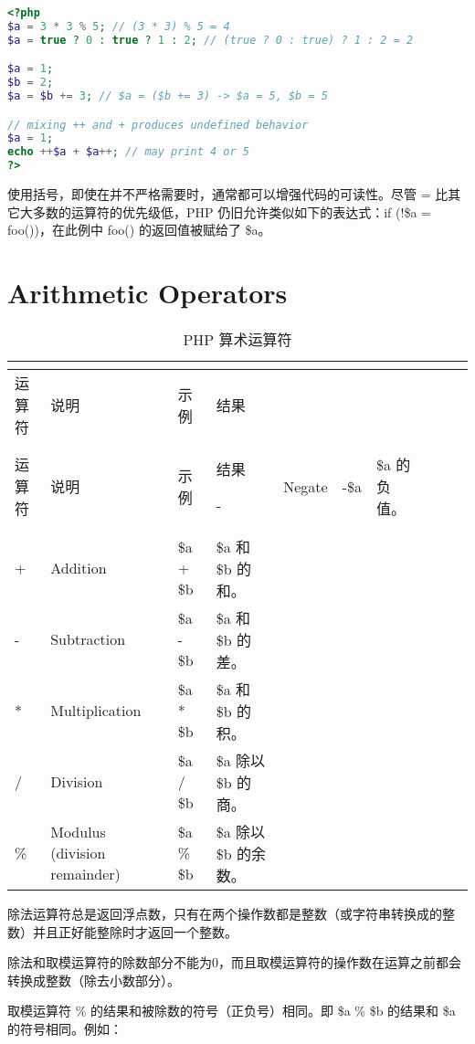 \begin{lstlisting}[language=PHP]
<?php
$a = 3 * 3 % 5; // (3 * 3) % 5 = 4
$a = true ? 0 : true ? 1 : 2; // (true ? 0 : true) ? 1 : 2 = 2

$a = 1;
$b = 2;
$a = $b += 3; // $a = ($b += 3) -> $a = 5, $b = 5

// mixing ++ and + produces undefined behavior
$a = 1;
echo ++$a + $a++; // may print 4 or 5
?>
\end{lstlisting}

使用括号，即使在并不严格需要时，通常都可以增强代码的可读性。尽管 = 比其它大多数的运算符的优先级低，PHP 仍旧允许类似如下的表达式：if (!\$a = foo())，在此例中 foo() 的返回值被赋给了 \$a。

\section{Arithmetic Operators}

\begin{longtable}{|m{35pt}|m{130pt}|m{50pt}|m{150pt}|}
\tabularnewline\hline
运算符	&说明	&示例	&结果
\endhead

\caption{PHP 算术运算符}\\
\hline
运算符	&说明	&示例	&结果
\endfirsthead

\endfoot

\endlastfoot
\hline
- &Negate		&-\$a					&\$a 的负值。\\
\hline
+	&Addition		&\$a + \$b		&\$a 和 \$b 的和。\\
\hline
-	&Subtraction	&\$a - \$b		&\$a 和 \$b 的差。\\
\hline
*	&Multiplication	&\$a * \$b		&\$a 和 \$b 的积。\\
\hline
/	&Division		&\$a / \$b		&\$a 除以\$b 的商。\\
\hline
\%	&Modulus (division remainder)	&\$a \% \$b &\$a 除以 \$b 的余数。\\
\hline
\end{longtable}



除法运算符总是返回浮点数，只有在两个操作数都是整数（或字符串转换成的整数）并且正好能整除时才返回一个整数。

除法和取模运算符的除数部分不能为0，而且取模运算符的操作数在运算之前都会转换成整数（除去小数部分）。

取模运算符 \% 的结果和被除数的符号（正负号）相同。即 \$a \% \$b 的结果和 \$a 的符号相同。例如：

